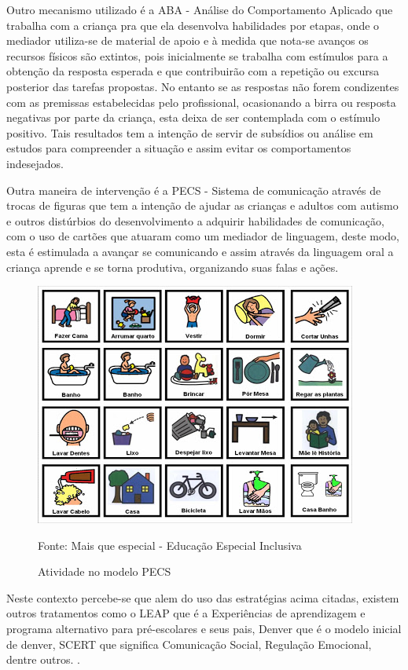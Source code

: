		Outro mecanismo utilizado é a ABA - Análise do Comportamento Aplicado que trabalha com a criança pra que ela desenvolva habilidades por etapas, onde o mediador utiliza-se de material de apoio e à medida que nota-se avanços os recursos físicos são extintos, pois inicialmente se trabalha com estímulos para a obtenção da resposta esperada e que contribuirão com a repetição ou excursa posterior das tarefas propostas. No entanto se as respostas não forem condizentes com as premissas estabelecidas pelo profissional, ocasionando a birra ou resposta negativas por parte da criança, esta deixa de ser contemplada com o estímulo positivo. Tais resultados tem  a intenção de servir de subsídios ou análise em estudos para compreender a situação e assim evitar os comportamentos indesejados. \cite{mesquita2013diagnostico}
		
		Outra maneira de intervenção é a PECS - Sistema de comunicação através de trocas de figuras que tem a intenção de ajudar as crianças e adultos com autismo e outros distúrbios do desenvolvimento a adquirir habilidades de comunicação, com o uso de cartões que atuaram como um mediador de linguagem, deste modo, esta é estimulada a avançar se comunicando e assim através da linguagem oral a criança aprende e se torna produtiva, organizando suas falas e ações.\cite{mesquita2013diagnostico}
		
		\begin{figure}[H]
			\centering
			\includegraphics[scale=0.6]{img/materialPECS}
			\caption{Atividade no modelo PECS}
			Fonte: Mais que especial - Educação Especial Inclusiva
			\label{fig:figura4}
		\end{figure}
		
		Neste contexto percebe-se que alem do uso das estratégias acima citadas, existem outros tratamentos como o LEAP que é a Experiências de aprendizagem e programa alternativo para pré-escolares e seus pais, Denver que é o modelo inicial de denver, SCERT que significa Comunicação Social, Regulação Emocional, dentre outros. \cite{schmidt2017transtorno}.
	
